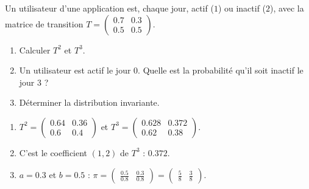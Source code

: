 \begin{exercise}
Un utilisateur d'une application est, chaque jour, actif ($1$) ou inactif ($2$), avec la matrice de transition $T=\begin{pmatrix}\num{0,7}&\num{0,3}\\\num{0,5}&\num{0,5}\end{pmatrix}$.
\begin{enumerate}
\item Calculer $T^2$ et $T^3$.
\item Un utilisateur est actif le jour $0$. Quelle est la probabilité qu'il soit inactif le jour $3$ ?
\item Déterminer la distribution invariante.
\end{enumerate}
\end{exercise}
\begin{solution}
\begin{enumerate}
\item $T^2=\begin{pmatrix}\num{0,64}&\num{0,36}\\\num{0,6}&\num{0,4}\end{pmatrix}$ et $T^3=\begin{pmatrix}\num{0,628}&\num{0,372}\\\num{0,62}&\num{0,38}\end{pmatrix}$.
\item C'est le coefficient $(1,2)$ de $T^3$ : $\num{0,372}$.
\item $a=\num{0,3}$ et $b=\num{0,5}$ : $\pi=\begin{pmatrix}\frac{\num{0,5}}{\num{0,8}}&\frac{\num{0,3}}{\num{0,8}}\end{pmatrix}=\begin{pmatrix}\frac58&\frac38\end{pmatrix}$.
\end{enumerate}
\end{solution}

